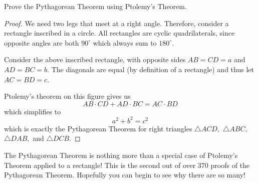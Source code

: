 \begin{example}
Prove the Pythagorean Theorem using Ptolemy's Theorem.
\end{example}
\begin{proof}
We need two legs that meet at a right angle. Therefore, consider a rectangle inscribed in a circle. All rectangles are cyclic quadrilaterals, since opposite angles are both $90^\circ$ which always sum to $180^\circ$. 
\begin{center}
\end{center}
Consider the above inscribed rectangle, with opposite sides $AB = CD = a$ and $AD = BC = b$. The diagonals are equal (by definition of a rectangle) and thus let $AC = BD = c$. 

Ptolemy's theorem on this figure gives us 
\[
AB \cdot CD + AD \cdot BC = AC \cdot BD
\]
which simplifies to 
\[
a^2 + b^2 = c^2
\]
which is exactly the Pythagorean Theorem for right triangles $\triangle ACD, $ $\triangle ABC,$ $ \triangle DAB, $ and $\triangle DCB$. 
\end{proof}
The Pythagorean Theorem is nothing more than a special case of Ptolemy's Theorem applied to a rectangle! This is the second out of over 370 proofs of the Pythagorean Theorem. Hopefully you can begin to see why there are so many!

